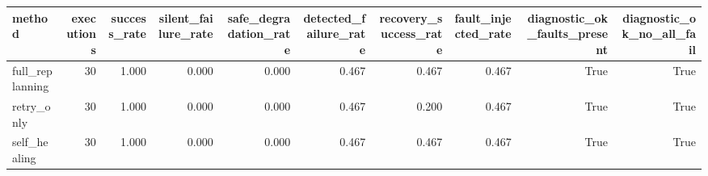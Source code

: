 \begin{tabular}{lrrrrrrrrr}
\toprule
method & executions & success_rate & silent_failure_rate & safe_degradation_rate & detected_failure_rate & recovery_success_rate & fault_injected_rate & diagnostic_ok_faults_present & diagnostic_ok_no_all_fail \\
\midrule
full_replanning & 30 & 1.000 & 0.000 & 0.000 & 0.467 & 0.467 & 0.467 & True & True \\
retry_only & 30 & 1.000 & 0.000 & 0.000 & 0.467 & 0.200 & 0.467 & True & True \\
self_healing & 30 & 1.000 & 0.000 & 0.000 & 0.467 & 0.467 & 0.467 & True & True \\
\bottomrule
\end{tabular}
